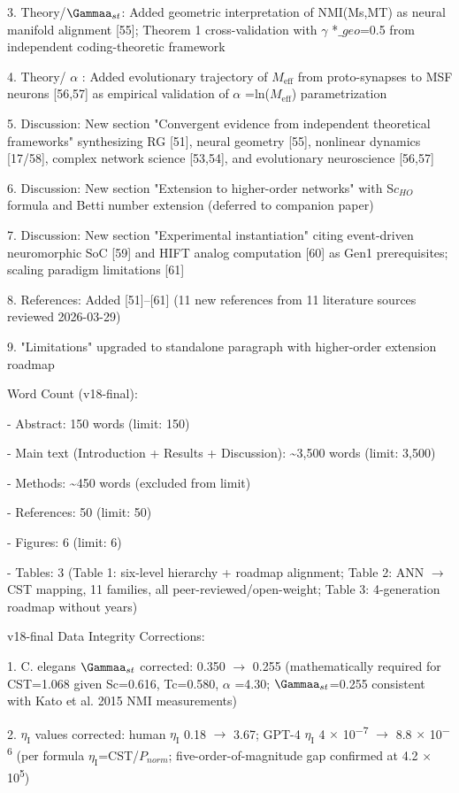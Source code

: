 \documentclass[a4paper,12pt]{article}
\begin{document}
3. Theory/$\Gammaa_{st}$: Added geometric interpretation of NMI(Ms,MT) as neural manifold alignment [55]; Theorem 1 cross-validation with  $\gamma$ *$\_geo$=0.5 from independent coding-theoretic framework

4. Theory/ $\alpha$ : Added evolutionary trajectory of $M_{\text{eff}}$ from proto-synapses to MSF neurons [56,57] as empirical validation of  $\alpha$ =ln($M_{\text{eff}}$) parametrization

5. Discussion: New section "Convergent evidence from independent theoretical frameworks" synthesizing RG [51], neural geometry [55], nonlinear dynamics [17/58], complex network science [53,54], and evolutionary neuroscience [56,57]

6. Discussion: New section "Extension to higher-order networks" with S$c_{HO}$ formula and Betti number extension (deferred to companion paper)

7. Discussion: New section "Experimental instantiation" citing event-driven neuromorphic SoC [59] and HIFT analog computation [60] as Gen1 prerequisites; scaling paradigm limitations [61]

8. References: Added [51]--[61] (11 new references from 11 literature sources reviewed 2026-03-29)

9. "Limitations" upgraded to standalone paragraph with higher-order extension roadmap

Word Count (v18-final):

- Abstract: 150 words \checkmark (limit: 150)

- Main text (Introduction + Results + Discussion): \textasciitilde{}3,500 words \checkmark (limit: 3,500)

- Methods: \textasciitilde{}450 words (excluded from limit)

- References: 50 \checkmark (limit: 50)

- Figures: 6 \checkmark (limit: 6)

- Tables: 3 (Table 1: six-level hierarchy + roadmap alignment; Table 2: ANN $\rightarrow$ CST mapping, 11 families, all peer-reviewed/open-weight; Table 3: 4-generation roadmap without years)

v18-final Data Integrity Corrections:

1. C. elegans $\Gammaa_{st}$ corrected: 0.350 $\rightarrow$ 0.255 (mathematically required for CST=1.068 given Sc=0.616, Tc=0.580,  $\alpha$ =4.30; $\Gammaa_{st}$=0.255 consistent with Kato et al. 2015 NMI measurements)

2. $\eta_{\text{I}}$ values corrected: human $\eta_{\text{I}}$ 0.18 $\rightarrow$ 3.67; GPT-4 $\eta_{\text{I}}$ 4 $\times$ 10\textsuperscript{$-$}\textsuperscript{7} $\rightarrow$ 8.8 $\times$ 10\textsuperscript{$-$}\textsuperscript{6} (per formula $\eta_{\text{I}}$=CST/$P_{norm}$; five-order-of-magnitude gap confirmed at 4.2 $\times$ 10\textsuperscript{5})
\end{document}
